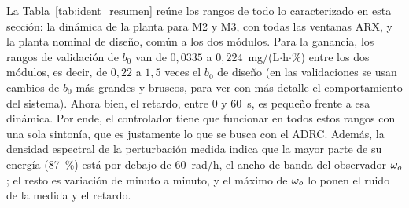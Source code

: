 La Tabla~\ref{tab:ident_resumen} reúne los rangos de todo lo caracterizado en
esta sección: la dinámica de la planta para M2 y M3, con todas las ventanas
ARX, y la planta nominal de diseño, común a los dos módulos. Para la ganancia, los rangos de validación de $b_0$ van de $0{,}0335$ a $0{,}224$~mg/(L$\cdot$h$\cdot$\%)
entre los dos módulos, es decir, de $0{,}22$ a $1{,}5$ veces el $b_0$ de diseño (en las validaciones se usan cambios de $b_0$ más grandes y bruscos, para ver con más detalle el comportamiento del sistema). Ahora bien, el
retardo, entre 0 y 60~s, es pequeño frente a
esa dinámica. Por ende, el controlador tiene que funcionar en todos estos
rangos con una sola sintonía, que es justamente lo que se busca con el ADRC.
Además, la densidad espectral de la perturbación medida indica que la mayor parte de su energía
(87~\%) está por debajo de 60~rad/h, el ancho de banda del observador $\omega_{o}$; el resto es
variación de minuto a minuto, y el máximo de $\omega_{o}$ lo ponen el ruido de la medida y el retardo.

